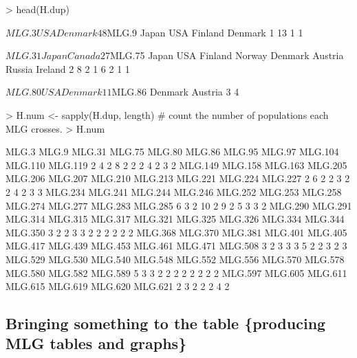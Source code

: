 \documentclass[letterpaper]{article}
\begin{document}
\begin{Schunk}
\begin{Sinput}
> head(H.dup)
\end{Sinput}
\begin{Soutput}
$MLG.3
    USA Denmark 
      4       8 

$MLG.9
  Japan     USA Finland Denmark 
      1      13       1       1 

$MLG.31
 Japan Canada 
     2      7 

$MLG.75
  Japan     USA Finland  Norway Denmark Austria  Russia Ireland 
      2       8       2       1       6       2       1       1 

$MLG.80
    USA Denmark 
      1       1 

$MLG.86
Denmark Austria 
      3       4 
\end{Soutput}
\begin{Sinput}
> H.num <- sapply(H.dup, length) # count the number of populations each MLG crosses.
> H.num
\end{Sinput}
\begin{Soutput}
  MLG.3   MLG.9  MLG.31  MLG.75  MLG.80  MLG.86  MLG.95  MLG.97 MLG.104 MLG.110 MLG.119 
      2       4       2       8       2       2       2       4       2       3       2 
MLG.149 MLG.158 MLG.163 MLG.205 MLG.206 MLG.207 MLG.210 MLG.213 MLG.221 MLG.224 MLG.227 
      2       6       2       2       3       2       2       4       2       3       3 
MLG.234 MLG.241 MLG.244 MLG.246 MLG.252 MLG.253 MLG.258 MLG.274 MLG.277 MLG.283 MLG.285 
      6       3       2      10       2       9       2       5       3       3       2 
MLG.290 MLG.291 MLG.314 MLG.315 MLG.317 MLG.321 MLG.325 MLG.326 MLG.334 MLG.344 MLG.350 
      3       2       2       3       3       2       2       2       2       2       2 
MLG.368 MLG.370 MLG.381 MLG.401 MLG.405 MLG.417 MLG.439 MLG.453 MLG.461 MLG.471 MLG.508 
      3       2       3       3       3       5       2       2       3       2       3 
MLG.529 MLG.530 MLG.540 MLG.548 MLG.552 MLG.556 MLG.570 MLG.578 MLG.580 MLG.582 MLG.589 
      5       3       3       2       2       2       2       2       2       2       2 
MLG.597 MLG.605 MLG.611 MLG.615 MLG.619 MLG.620 MLG.621 
      2       3       2       2       2       4       2 
\end{Soutput}
\end{Schunk}
\subsection{Bringing something to the table \{producing MLG tables and graphs\}}\label{mlg:table}
\end{document}
